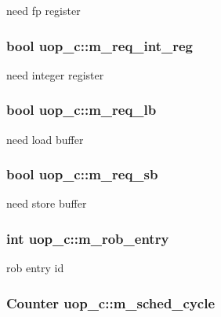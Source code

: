 \label{classuop__c_ac9a30f13d75fc5b053cba1eee35b5c04}
need fp register \hypertarget{classuop__c_a356f4516637d65fd2c0cd489f263034b}{
\subsubsection[{m\_\-req\_\-int\_\-reg}]{\setlength{\rightskip}{0pt plus 5cm}bool {\bf uop\_\-c::m\_\-req\_\-int\_\-reg}}}
\label{classuop__c_a356f4516637d65fd2c0cd489f263034b}
need integer register \hypertarget{classuop__c_af40e746fafa6e749df329ffe5eeda710}{
\subsubsection[{m\_\-req\_\-lb}]{\setlength{\rightskip}{0pt plus 5cm}bool {\bf uop\_\-c::m\_\-req\_\-lb}}}
\label{classuop__c_af40e746fafa6e749df329ffe5eeda710}
need load buffer \hypertarget{classuop__c_a8473ef6f48319a2a2b442e14e2291268}{
\subsubsection[{m\_\-req\_\-sb}]{\setlength{\rightskip}{0pt plus 5cm}bool {\bf uop\_\-c::m\_\-req\_\-sb}}}
\label{classuop__c_a8473ef6f48319a2a2b442e14e2291268}
need store buffer \hypertarget{classuop__c_aa13e7e0e95d53edfca66b5c487412039}{
\subsubsection[{m\_\-rob\_\-entry}]{\setlength{\rightskip}{0pt plus 5cm}int {\bf uop\_\-c::m\_\-rob\_\-entry}}}
\label{classuop__c_aa13e7e0e95d53edfca66b5c487412039}
rob entry id \hypertarget{classuop__c_a0abddd71c924e7ef2c994a68f4a96d2e}{
\subsubsection[{m\_\-sched\_\-cycle}]{\setlength{\rightskip}{0pt plus 5cm}Counter {\bf uop\_\-c::m\_\-sched\_\-cycle}}}
